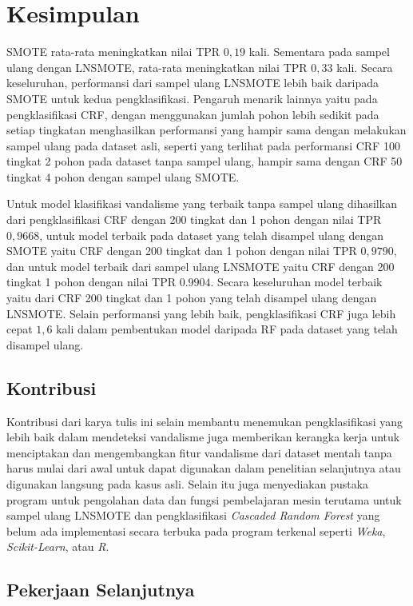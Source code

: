 \chapter{Kesimpulan}

SMOTE rata-rata meningkatkan nilai TPR $0,19$ kali.
Sementara pada sampel ulang dengan LNSMOTE, rata-rata meningkatkan nilai TPR
$0,33$ kali.
Secara keseluruhan, performansi dari sampel ulang LNSMOTE lebih baik daripada
SMOTE untuk kedua pengklasifikasi.
Pengaruh menarik lainnya yaitu pada pengklasifikasi CRF, dengan menggunakan
jumlah pohon lebih sedikit pada setiap tingkatan menghasilkan performansi yang
hampir sama dengan melakukan sampel ulang pada dataset asli, seperti yang
terlihat pada performansi CRF 100 tingkat 2 pohon pada dataset tanpa sampel
ulang, hampir sama dengan CRF 50 tingkat 4 pohon dengan sampel ulang SMOTE.

Untuk model klasifikasi vandalisme yang terbaik tanpa sampel ulang dihasilkan
dari pengklasifikasi CRF dengan 200 tingkat dan 1 pohon dengan nilai TPR
$0,9668$,
untuk model terbaik pada dataset yang telah disampel ulang dengan SMOTE yaitu
CRF dengan 200 tingkat dan 1 pohon dengan nilai TPR $0,9790$,
dan untuk model terbaik dari sampel ulang LNSMOTE yaitu CRF dengan 200 tingkat
1 pohon dengan nilai TPR $0.9904$.
Secara keseluruhan model terbaik yaitu dari CRF 200 tingkat dan 1 pohon yang
telah disampel ulang dengan LNSMOTE.
Selain performansi yang lebih baik, pengklasifikasi CRF juga lebih cepat $1,6$
kali dalam pembentukan model daripada RF pada dataset yang telah disampel
ulang.

\section{Kontribusi}

Kontribusi dari karya tulis ini selain membantu menemukan pengklasifikasi yang
lebih baik dalam mendeteksi vandalisme juga memberikan kerangka kerja untuk
menciptakan dan mengembangkan fitur vandalisme dari dataset mentah tanpa harus
mulai dari awal untuk dapat digunakan dalam penelitian selanjutnya atau
digunakan langsung pada kasus asli. Selain itu juga menyediakan pustaka program
untuk pengolahan data dan fungsi pembelajaran mesin terutama untuk sampel ulang
LNSMOTE dan pengklasifikasi
\textit{Cascaded Random Forest} yang belum ada implementasi secara terbuka pada
program terkenal seperti \textit{Weka}, \textit{Scikit-Learn}, atau \textit{R}.

\section{Pekerjaan Selanjutnya}

